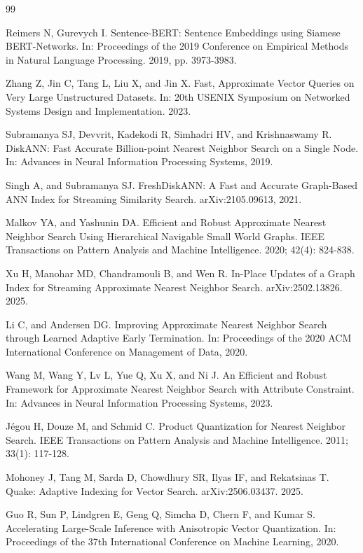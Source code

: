 \documentclass[journal,article,submit,pdftex,moreauthors]{Definitions/mdpi}
\begin{document}
\begin{thebibliography}{99}

Reimers N, Gurevych I. Sentence-BERT: Sentence Embeddings using Siamese BERT-Networks. In: Proceedings of the 2019 Conference on Empirical Methods in Natural Language Processing. 2019, pp. 3973-3983.

Zhang Z, Jin C, Tang L, Liu X, and Jin X. Fast, Approximate Vector Queries on Very Large Unstructured Datasets. In: 20th USENIX Symposium on Networked Systems Design and Implementation. 2023.

Subramanya SJ, Devvrit, Kadekodi R, Simhadri HV, and Krishnaswamy R. DiskANN: Fast Accurate Billion-point Nearest Neighbor Search on a Single Node. In: Advances in Neural Information Processing Systems, 2019.

Singh A, and Subramanya SJ. FreshDiskANN: A Fast and Accurate Graph-Based ANN Index for Streaming Similarity Search. arXiv:2105.09613, 2021.

Malkov YA, and Yashunin DA. Efficient and Robust Approximate Nearest Neighbor Search Using Hierarchical Navigable Small World Graphs. IEEE Transactions on Pattern Analysis and Machine Intelligence. 2020; 42(4): 824-838.

Xu H, Manohar MD, Chandramouli B, and Wen R. In-Place Updates of a Graph Index for Streaming Approximate Nearest Neighbor Search. arXiv:2502.13826. 2025.

Li C, and Andersen DG. Improving Approximate Nearest Neighbor Search through Learned Adaptive Early Termination. In: Proceedings of the 2020 ACM International Conference on Management of Data, 2020.

Wang M, Wang Y, Lv L, Yue Q, Xu X, and Ni J. An Efficient and Robust Framework for Approximate Nearest Neighbor Search with Attribute Constraint. In: Advances in Neural Information Processing Systems, 2023.

Jégou H, Douze M, and Schmid C. Product Quantization for Nearest Neighbor Search. IEEE Transactions on Pattern Analysis and Machine Intelligence. 2011; 33(1): 117-128.

Mohoney J, Tang M, Sarda D, Chowdhury SR, Ilyas IF, and Rekatsinas T. Quake: Adaptive Indexing for Vector Search. arXiv:2506.03437. 2025.

Guo R, Sun P, Lindgren E, Geng Q, Simcha D, Chern F, and Kumar S. Accelerating Large-Scale Inference with Anisotropic Vector Quantization. In: Proceedings of the 37th International Conference on Machine Learning, 2020.


\end{thebibliography}
\end{document}
